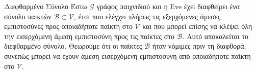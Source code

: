 {}
\begin{definitiongr}{Διεφθαρμένο Σύνολο}
  Έστω $\mathcal{G}$ γράφος παιχνιδιού και η \textlatin{Eve} έχει διαφθείρει ένα σύνολο παικτών $\mathcal{B} \subset
  \mathcal{V}$, έτσι που ελέγχει πλήρως τις εξερχόμενες άμεσες εμπιστοσύνες προς οποιαδήποτε παίκτη στο $\mathcal{V}$ και που
  μπορεί επίσης να κλέψει όλη την εισερχόμενη άμεση εμπιστοσύνη προς τις παίκτες στο $\mathcal{B}$. Αυτό αποκαλείται το
  διεφθαρμένο σύνολο. Θεωρούμε ότι οι παίκτες $\mathcal{B}$ ήταν νόμιμες πριν τη διαφθορά, συνεπώς μπορεί να έχουν άμεση
  εισερχόμενη εμπιστοσύνη από οποιαδήποτε παίκτη στο $\mathcal{V}$.
\end{definitiongr}
